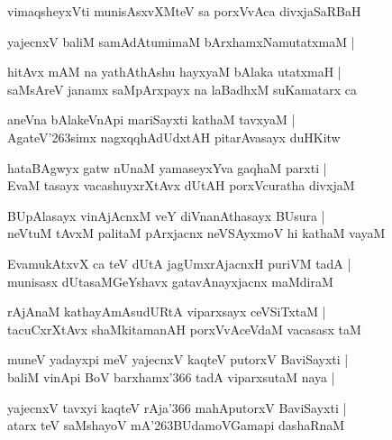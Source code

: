 \begin{shloka}
vimaqsheyxVti munisAsxvXMteV sa porxVvAca divxjaSaRBaH
\end{shloka}

\begin{shloka}
yajecnxV baliM samAdAtumimaM bArxhamxNamutatxmaM |
\end{shloka}

\begin{shloka}
hitAvx mAM na yathAthAshu hayxyaM bAlaka utatxmaH |\\
saMsAreV janamx saMpArxpayx na laBadhxM suKamatarx ca
\end{shloka}

\begin{shloka}
aneVna bAlakeVnApi mariSayxti kathaM tavxyaM |\\
AgateV\char'263simx nagxqqhAdUdxtAH pitarAvasayx duHKitw
\end{shloka}

\begin{shloka}
hataBAgwyx gatw nUnaM yamaseyxYva gaqhaM parxti |\\
EvaM tasayx vacashuyxrXtAvx dUtAH porxVcuratha divxjaM 
\end{shloka}

\begin{shloka}
BUpAlasayx vinAjAcnxM veY diVnanAthasayx BUsura |\\
neVtuM tAvxM palitaM pArxjacnx neVSAyxmoV hi kathaM vayaM
\end{shloka}

\begin{shloka}
EvamukAtxvX ca teV dUtA jagUmxrAjacnxH puriVM tadA |\\
munisasx dUtasaMGeYshavx gatavAnayxjacnx maMdiraM
\end{shloka}

\begin{shloka}
rAjAnaM kathayAmAsudURtA viparxsayx ceVSiTxtaM |\\
tacuCxrXtAvx shaMkitamanAH porxVvAceVdaM vacasasx taM
\end{shloka}

\begin{shloka}
muneV yadayxpi meV yajecnxV kaqteV putorxV BaviSayxti |\\
baliM vinApi BoV barxhamx\char'366 tadA viparxsutaM naya |
\end{shloka}

\begin{shloka}
yajecnxV tavxyi kaqteV rAja\char'366 mahAputorxV BaviSayxti |\\
atarx teV saMshayoV mA\char'263BUdamoVGamapi dashaRnaM
\end{shloka}

